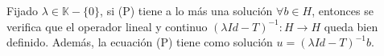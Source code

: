 \begin{corollary}
  Fijado $\lambda\in \mathbb{K}-\{0\}$, si (P) tiene a lo más una solución
  $\forall  b\in H$, entonces se verifica que el operador lineal y continuo
  $(\lambda Id-T)^{-1}:H\to H$ queda bien definido. Además, la ecuación (P)
  tiene como solución $u=(\lambda Id-T)^{-1} b$.
\end{corollary}
